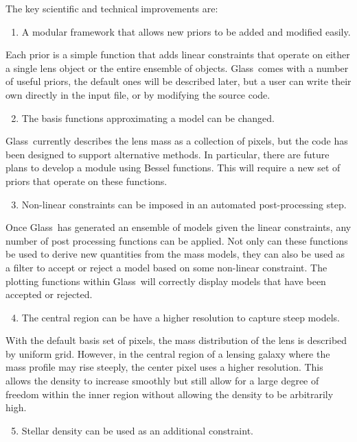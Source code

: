 \documentclass[galley,usenatbib]{mn2e}
\newcommand{\Glass}{{\sc Glass}}
\begin{document}
The key scientific and technical improvements are:
%
\begin{enumerate}
  \setcounter{enumi}{0}
  \item A modular framework that allows new priors to be added and modified easily.
\end{enumerate}
%
Each prior is a simple function that adds linear constraints that operate on either
a single lens object or the entire ensemble of objects. \Glass\ comes with a number
of useful priors, the default ones will be described later, but a user can
write their own directly in the input file, or by modifying the source code.
%
\begin{enumerate}
  \setcounter{enumi}{1}
  \item The basis functions approximating a model can be changed. 
\end{enumerate}
%
\Glass\ currently describes the lens mass as a collection of pixels, but the code
has been designed to support alternative methods. In particular, there are future
plans to develop a module using Bessel functions. This will require a new set of 
priors that operate on these functions.
%
\begin{enumerate}
  \setcounter{enumi}{2}
  \item Non-linear constraints can be imposed in an automated post-processing step. 
\end{enumerate}
%
Once \Glass\ has generated an ensemble of models given the linear constraints, any number
of post processing functions can be applied. Not only can these functions be used to
derive new quantities from the mass models, they can also be used as a filter to 
accept or reject a model based on some non-linear constraint. The plotting functions
within \Glass\ will correctly display models that have been accepted or rejected.
%
\begin{enumerate}
  \setcounter{enumi}{3}
  \item The central region can be have a higher resolution to capture steep models. 
\end{enumerate}
%
With the default basis set of pixels, the mass distribution of the lens is
described by uniform grid. However, in the central region of a lensing galaxy
where the mass profile may rise steeply, the center pixel uses a higher
resolution. This allows the density to increase smoothly but still allow for
a large degree of freedom within the inner region without allowing the density
to be arbitrarily high. 
%
\begin{enumerate}
  \setcounter{enumi}{4}
  \item Stellar density can be used as an additional constraint.  
\end{enumerate}
\end{document}
